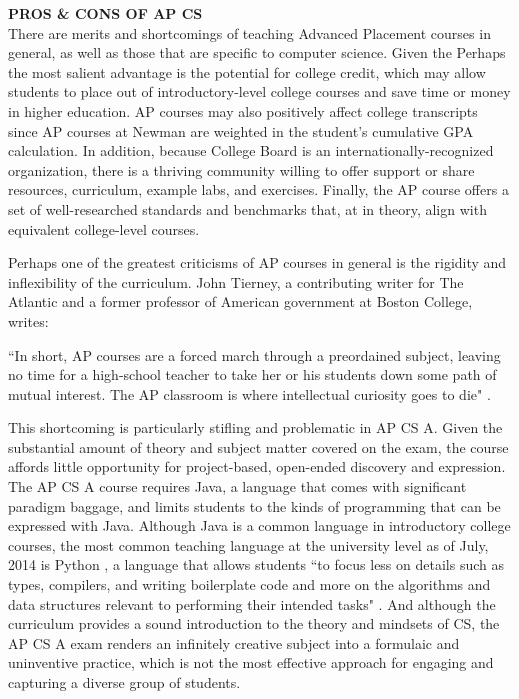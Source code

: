 \textbf{PROS \& CONS OF AP CS} \\
There are merits and shortcomings of teaching Advanced Placement courses in general, as well as those that are specific to computer science. Given the 
Perhaps the most salient advantage is the potential for college credit, which may allow students to place out of introductory-level college courses and save time or money in higher education. AP courses may also positively affect college transcripts since AP courses at Newman are weighted in the student’s cumulative GPA calculation. In addition, because College Board is an internationally-recognized organization, there is a thriving community willing to offer support or share resources, curriculum, example labs, and exercises. Finally, the AP course offers a set of well-researched standards and benchmarks that, at in theory, align with equivalent college-level courses. \par
Perhaps one of the greatest criticisms of AP courses in general is the rigidity and inflexibility of the curriculum. John Tierney, a contributing writer for The Atlantic and a former professor of American government at Boston College, writes:
\begin{blockquote}
	``In short, AP courses are a forced march through a preordained subject, leaving no time for a high-school teacher to take her or his students down some path of mutual interest. The AP classroom is where intellectual curiosity goes to die" \cite{atlantic}.
	\end{blockquote}
This shortcoming is particularly stifling and problematic in AP CS A. Given the substantial amount of theory and subject matter covered on the exam, the course affords little opportunity for project-based, open-ended discovery and expression. The AP CS A course requires Java, a language that comes with significant paradigm baggage, and limits students to the kinds of programming that can be expressed with Java. Although Java is a common language in introductory college courses, the most common teaching language at the university level as of July, 2014 is Python \cite{unilang}, a language that allows students ``to focus less on details such as types, compilers, and writing boilerplate code and more on the algorithms and data structures relevant to performing their intended tasks" \cite{guo}. And although the curriculum provides a sound introduction to the theory and mindsets of CS, the AP CS A exam renders an infinitely creative subject into a formulaic and uninventive practice, which is not the most effective approach for engaging and capturing a diverse group of students. \par 
